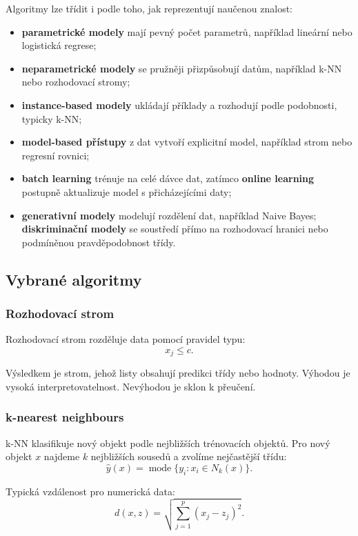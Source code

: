 Algoritmy lze třídit i podle toho, jak reprezentují naučenou znalost:
\begin{itemize}
    \item \textbf{parametrické modely} mají pevný počet parametrů, například lineární nebo logistická
    regrese;
    \item \textbf{neparametrické modely} se pružněji přizpůsobují datům, například k-NN nebo rozhodovací
    stromy;
    \item \textbf{instance-based modely} ukládají příklady a rozhodují podle podobnosti, typicky k-NN;
    \item \textbf{model-based přístupy} z dat vytvoří explicitní model, například strom nebo regresní
    rovnici;
    \item \textbf{batch learning} trénuje na celé dávce dat, zatímco \textbf{online learning} postupně
    aktualizuje model s přicházejícími daty;
    \item \textbf{generativní modely} modelují rozdělení dat, například Naive Bayes; \textbf{diskriminační
    modely} se soustředí přímo na rozhodovací hranici nebo podmíněnou pravděpodobnost třídy.
\end{itemize}

\subsection{Vybrané algoritmy}

\subsubsection{Rozhodovací strom}

Rozhodovací strom rozděluje data pomocí pravidel typu:
\[
x_j \leq c.
\]

Výsledkem je strom, jehož listy obsahují predikci třídy nebo hodnoty. Výhodou je vysoká interpretovatelnost.
Nevýhodou je sklon k přeučení.

\subsubsection{k-nearest neighbours}

k-NN klasifikuje nový objekt podle nejbližších trénovacích objektů. Pro nový objekt $x$ najdeme $k$ nejbližších
sousedů a zvolíme nejčastější třídu:
\[
\hat{y}(x)=\operatorname{mode}\{y_i: x_i \in N_k(x)\}.
\]

Typická vzdálenost pro numerická data:
\[
d(x,z)=\sqrt{\sum_{j=1}^p (x_j-z_j)^2}.
\]

